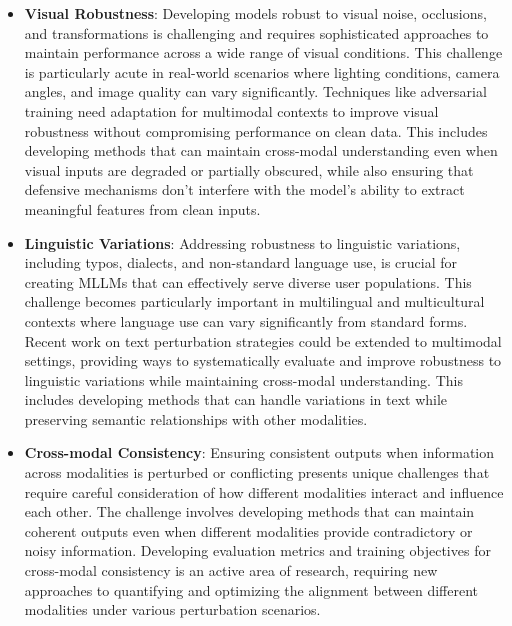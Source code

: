 \begin{itemize}
    \item \textbf{Visual Robustness}: Developing models robust to visual noise, occlusions, and transformations is challenging and requires sophisticated approaches to maintain performance across a wide range of visual conditions. This challenge is particularly acute in real-world scenarios where lighting conditions, camera angles, and image quality can vary significantly. Techniques like adversarial training \citep{madry2018towards} need adaptation for multimodal contexts to improve visual robustness without compromising performance on clean data. This includes developing methods that can maintain cross-modal understanding even when visual inputs are degraded or partially obscured, while also ensuring that defensive mechanisms don't interfere with the model's ability to extract meaningful features from clean inputs.
    
    \item \textbf{Linguistic Variations}: Addressing robustness to linguistic variations, including typos, dialects, and non-standard language use, is crucial for creating MLLMs that can effectively serve diverse user populations. This challenge becomes particularly important in multilingual and multicultural contexts where language use can vary significantly from standard forms. Recent work on text perturbation strategies \citep{tan2020mind} could be extended to multimodal settings, providing ways to systematically evaluate and improve robustness to linguistic variations while maintaining cross-modal understanding. This includes developing methods that can handle variations in text while preserving semantic relationships with other modalities.
    
    \item \textbf{Cross-modal Consistency}: Ensuring consistent outputs when information across modalities is perturbed or conflicting presents unique challenges that require careful consideration of how different modalities interact and influence each other. The challenge involves developing methods that can maintain coherent outputs even when different modalities provide contradictory or noisy information. Developing evaluation metrics and training objectives for cross-modal consistency is an active area of research, requiring new approaches to quantifying and optimizing the alignment between different modalities under various perturbation scenarios.
\end{itemize}

